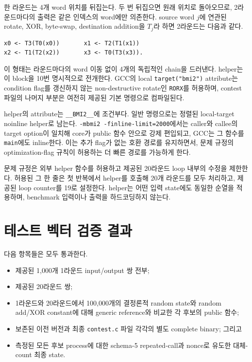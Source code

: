 \documentclass[11pt,a4paper]{article}
\begin{document}
한 라운드는 4개 word 위치를 뒤집는다.  두 번 뒤집으면 원래 위치로
돌아오므로, 2라운드마다의 출력은 같은 인덱스의 word에만 의존한다.
source word $j$에 연관된 rotate, XOR, byte-swap, destination addition을
$T_j$라 하면 2라운드는 다음과 같다.

\begin{lstlisting}
x0 <- T3(T0(x0))       x1 <- T2(T1(x1))
x2 <- T1(T2(x2))       x3 <- T0(T3(x3)).
\end{lstlisting}

이 형태는 라운드마다의 word 이동 없이 4개의 독립적인 chain을 드러낸다.
helper는 이 block을 10번 명시적으로 전개한다.  GCC의 local
\texttt{target("bmi2")} attribute는 condition flag를 갱신하지 않는
non-destructive rotate인 \texttt{RORX}를 허용하며, contest 파일의 나머지
부분은 여전히 제공된 기본 명령으로 컴파일된다.

helper의 attribute는 \texttt{\_\_BMI2\_\_}에 조건부다.  일반 명령으로는
정렬된 local-target noinline helper로 남는다.
\texttt{-mbmi2 -finline-limit=2000}에서는 caller와 callee의 target
option이 일치해 core가 public 함수 안으로 강제 편입되고, GCC는 그 함수를
\texttt{main}에도 inline한다.  이는 추가 flag가 없는 호환 경로를
유지하면서, 문제 규정의 optimization-flag 규칙이 허용하는 더 빠른
경로를 가능하게 한다.

문제 규정은 외부 helper 함수를 허용하고 제공된 20라운드 loop 내부의
수정을 제한한다.  허용된 그 한 줄은 첫 반복에서 helper를 호출해 20개
라운드를 모두 처리하고, 제공된 loop counter를 19로 설정한다.  helper는
어떤 입력 state에도 동일한 순열을 적용하며, benchmark 입력이나 출력을
하드코딩하지 않는다.

\section{테스트 벡터 검증 결과}

다음 항목들은 모두 통과한다.

\begin{itemize}
  \item 제공된 1,000개 1라운드 input/output 쌍 전부;
  \item 제공된 20라운드 쌍;
  \item 1라운드와 20라운드에서 100,000개의 결정론적 random state와
        random add/XOR constant에 대해 generic reference와 비교한 각
        후보의 public 함수;
  \item 보존된 이전 버전과 최종 \texttt{contest.c} 파일 각각의 별도
        complete binary; 그리고
  \item 측정된 모든 후보 process에 대한 schema-5 repeated-call과
        nonce로 유도한 대체-count 최종 state.
\end{itemize}
\end{document}
